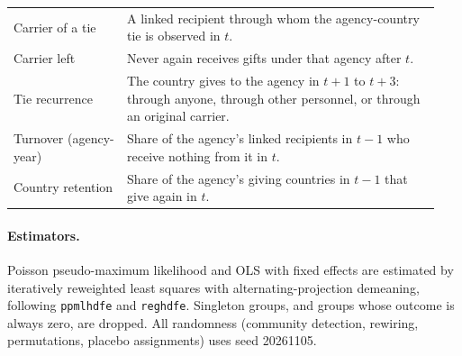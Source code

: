 \documentclass[11pt]{article}
\begin{document}
\begin{table}[ht]
\begin{tabular}{>{\raggedright\arraybackslash}p{0.25\linewidth}>{\raggedright\arraybackslash}p{0.69\linewidth}}
Carrier of a tie & A linked recipient through whom the agency-country tie is observed in $t$. \\
Carrier left & Never again receives gifts under that agency after $t$. \\
Tie recurrence & The country gives to the agency in $t+1$ to $t+3$: through anyone, through other personnel, or through an original carrier. \\
Turnover (agency-year) & Share of the agency's linked recipients in $t-1$ who receive nothing from it in $t$. \\
Country retention & Share of the agency's giving countries in $t-1$ that give again in $t$. \\
\bottomrule
\end{tabular}
\end{table}

\paragraph{Estimators.} Poisson pseudo-maximum likelihood and OLS with fixed effects are estimated by iteratively reweighted least squares with alternating-projection demeaning, following \texttt{ppmlhdfe} and \texttt{reghdfe}. Singleton groups, and groups whose outcome is always zero, are dropped. All randomness (community detection, rewiring, permutations, placebo assignments) uses seed 20261105.
\end{document}
